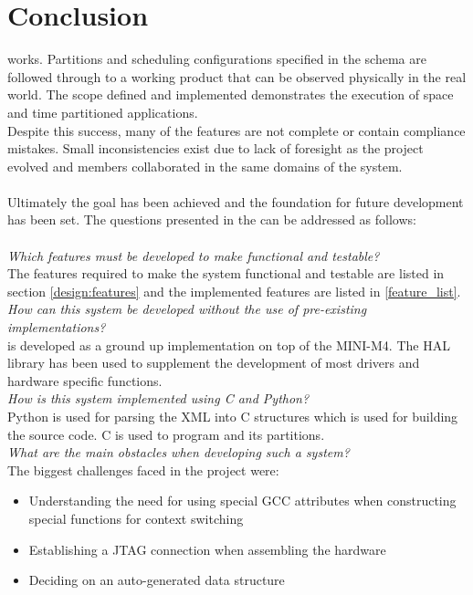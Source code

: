 \chapter{Conclusion}

\OSname{} works. 
Partitions and scheduling configurations specified 
in the schema are followed through to a working 
product that can be observed physically in the real world. 
The scope defined and implemented demonstrates the 
execution of space and time partitioned applications.
\\
Despite this success, many of the features are not 
complete or contain compliance mistakes. 
Small inconsistencies exist due to lack of foresight
as the project evolved and members collaborated 
in the same domains of the system.
\\\\
Ultimately the goal has been achieved and the 
foundation for future development has been set.
The questions presented in the  can be addressed as follows:
\\\\
\textit{Which features must be developed to make \OSname{} functional and
testable?}\\
The features required to make the system functional and testable are listed in  section \ref{design:features}
and the implemented features are listed in \ref{feature_list}.\\

\textit{How can this system be developed without the use of pre-existing
implementations?}\\
\OSname{} is developed as a ground up implementation on top of the MINI-M4.
The HAL library has been used to supplement the development of most drivers and hardware specific functions.\\

\textit{How is this system implemented using C and Python?}\\
Python is used for parsing the XML into C structures which is used for building the source code.
C is used to program \OSname{} and its partitions.\\

\textit{What are the main obstacles when developing such a system?}\\
The biggest challenges faced in the project were:
\begin{itemize}
	\item Understanding the need for using special GCC attributes when constructing special functions for context switching
	\item Establishing a JTAG connection when assembling the hardware
	\item Deciding on an auto-generated data structure
\end{itemize}

